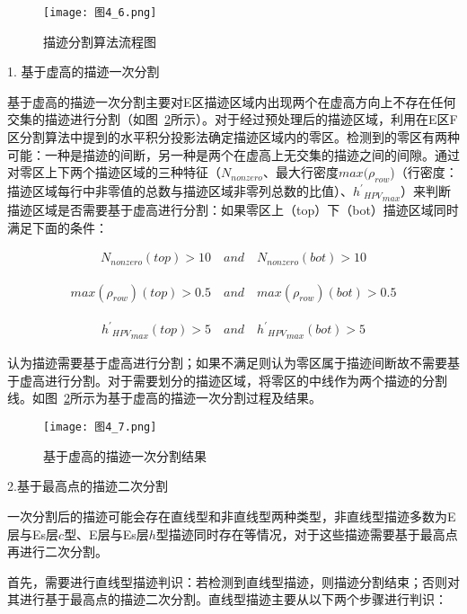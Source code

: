 \begin{figure}[!ht]
\centering
\texttt{[image: 图4\_6.png]}
\caption{描迹分割算法流程图}
\label{图4_6}
\end{figure}


1. 基于虚高的描迹一次分割

基于虚高的描迹一次分割主要对E区描迹区域内出现两个在虚高方向上不存在任何交集的描迹进行分割（如图~\ref{图4_7}所示）。对于经过预处理后的描迹区域，利用在E区F区分割算法中提到的水平积分投影法确定描迹区域内的零区。检测到的零区有两种可能：一种是描迹的间断，另一种是两个在虚高上无交集的描迹之间的间隙。通过对零区上下两个描迹区域的三种特征（$N_{nonzero}$、最大行密度$max(\rho_{row}$)（行密度：描迹区域每行中非零值的总数与描迹区域非零列总数的比值）、${{h^{'}}_{HPV}}_{max}$）来判断描迹区域是否需要基于虚高进行分割：如果零区上（top）下（bot）描迹区域同时满足下面的条件：
\begin{linenomath}
\begin{align}
N_{nonzero}(top)>10    \quad  and \quad N_{nonzero}(bot)>10
\label{式4_17}
\end{align}
\end{linenomath}
\begin{linenomath}
\begin{align}
max(\rho_{row})(top)>0.5  \quad and \quad max(\rho_{row})(bot)>0.5 
\label{式4_18}
\end{align}
\end{linenomath}
\begin{linenomath}
\begin{align}
{{h^{'}}_{HPV}}_{max}(top)>5   \quad and \quad {{h^{'}}_{HPV}}_{max}(bot)>5   
\label{式4_19}
\end{align}
\end{linenomath}
认为描迹需要基于虚高进行分割；如果不满足则认为零区属于描迹间断故不需要基于虚高进行分割。对于需要划分的描迹区域，将零区的中线作为两个描迹的分割线。如图~\ref{图4_7}所示为基于虚高的描迹一次分割过程及结果。
\begin{figure}[!ht]
\centering
\texttt{[image: 图4\_7.png]}
\caption{基于虚高的描迹一次分割结果}
\label{图4_7}
\end{figure}

2.基于最高点的描迹二次分割

一次分割后的描迹可能会存在直线型和非直线型两种类型，非直线型描迹多数为E层与Es层$c$型、E层与Es层$h$型描迹同时存在等情况，对于这些描迹需要基于最高点再进行二次分割。

首先，需要进行直线型描迹判识：若检测到直线型描迹，则描迹分割结束；否则对其进行基于最高点的描迹二次分割。直线型描迹主要从以下两个步骤进行判识：



